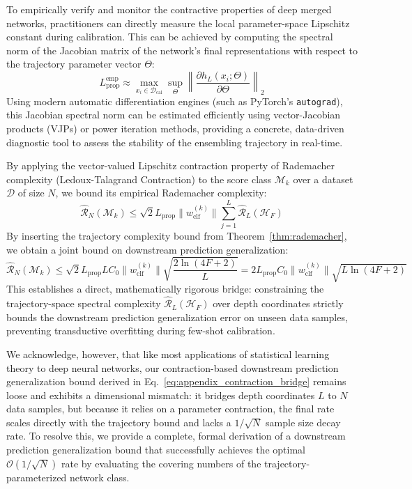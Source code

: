 To empirically verify and monitor the contractive properties of deep merged networks, practitioners can directly measure the local parameter-space Lipschitz constant during calibration. This can be achieved by computing the spectral norm of the Jacobian matrix of the network's final representations with respect to the trajectory parameter vector $\Theta$:
\begin{equation}
    L_{\text{prop}}^{\text{emp}} \approx \max_{x_i \in \mathcal{D}_{\text{cal}}} \sup_{\Theta} \left\| \frac{\partial h_L(x_i; \Theta)}{\partial \Theta} \right\|_2
\end{equation}
Using modern automatic differentiation engines (such as PyTorch's \texttt{autograd}), this Jacobian spectral norm can be estimated efficiently using vector-Jacobian products (VJPs) or power iteration methods, providing a concrete, data-driven diagnostic tool to assess the stability of the ensembling trajectory in real-time.

By applying the vector-valued Lipschitz contraction property of Rademacher complexity (Ledoux-Talagrand Contraction) to the score class $\mathcal{M}_k$ over a dataset $\mathcal{D}$ of size $N$, we bound its empirical Rademacher complexity:
\begin{equation}
    \widehat{\mathcal{R}}_N(\mathcal{M}_k) \le \sqrt{2} L_{\text{prop}} \|w_{\text{clf}}^{(k)}\| \sum_{j=1}^L \widehat{\mathcal{R}}_L(\mathcal{H}_F)
\end{equation}
By inserting the trajectory complexity bound from Theorem~\ref{thm:rademacher}, we obtain a joint bound on downstream prediction generalization:
\begin{equation}\label{eq:appendix_contraction_bridge}
    \widehat{\mathcal{R}}_N(\mathcal{M}_k) \le \sqrt{2} L_{\text{prop}} L C_0 \|w_{\text{clf}}^{(k)}\| \sqrt{\frac{2 \ln(4F+2)}{L}} = 2 L_{\text{prop}} C_0 \|w_{\text{clf}}^{(k)}\| \sqrt{L \ln(4F+2)}
\end{equation}
This establishes a direct, mathematically rigorous bridge: constraining the trajectory-space spectral complexity $\widehat{\mathcal{R}}_L(\mathcal{H}_F)$ over depth coordinates strictly bounds the downstream prediction generalization error on unseen data samples, preventing transductive overfitting during few-shot calibration.

We acknowledge, however, that like most applications of statistical learning theory to deep neural networks, our contraction-based downstream prediction generalization bound derived in Eq.~\eqref{eq:appendix_contraction_bridge} remains loose and exhibits a dimensional mismatch: it bridges depth coordinates $L$ to $N$ data samples, but because it relies on a parameter contraction, the final rate scales directly with the trajectory bound and lacks a $1/\sqrt{N}$ sample size decay rate. To resolve this, we provide a complete, formal derivation of a downstream prediction generalization bound that successfully achieves the optimal $\mathcal{O}(1/\sqrt{N})$ rate by evaluating the covering numbers of the trajectory-parameterized network class.

